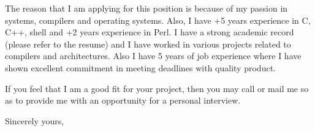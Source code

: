 \documentclass[11pt]{letter} %
\newcommand{\cmt}[1]{}
\begin{document}
\begin{letter}{
  \cmt{
  Jane Smith \\
Recruitment Officer \\
The Corporation \\
123 Pleasant Lane \\
City, State 12345
  }
}
The reason that I am applying for this position is because of my  passion in systems, compilers
and operating systems. Also, I have +5 years experience in C, C++, shell and +2 years experience in Perl.
I have a strong academic record (please refer to the resume) and I have worked in various projects related to 
compilers and architectures.
Also I have 5 years of job experience where I have shown excellent commitment in meeting deadlines with quality product.

If you feel that I am a good fit for your project, then you may call or mail me so as to provide me with an opportunity for a personal interview.

\closing{Sincerely yours,}

\end{letter}
\end{document}
